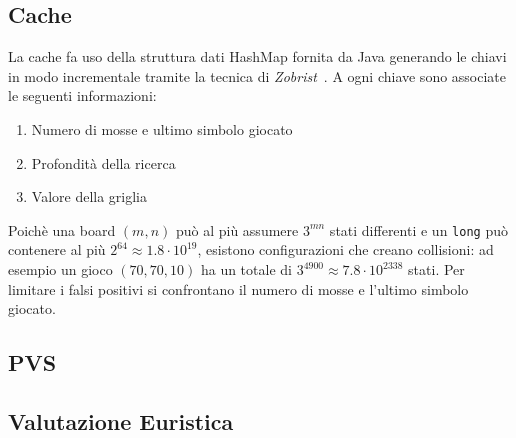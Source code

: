 \documentclass{article}
\begin{document}
\subsection{Cache}
La cache fa uso della struttura dati HashMap fornita da Java generando le chiavi 
in modo incrementale tramite la tecnica di \emph{Zobrist}~\cite{zobrist}. A ogni
chiave sono associate le seguenti informazioni:
\begin{enumerate}
  \item Numero di mosse e ultimo simbolo giocato
  \item Profondit\`a della ricerca
  \item Valore della griglia
\end{enumerate}
Poich\`e una board $(m,n)$ pu\`o al pi\`u assumere $3^{mn}$ stati differenti e
un \verb!long! pu\`o contenere al pi\`u $2^{64} \approx 1.8 \cdot 10^{19}$,
esistono configurazioni che creano collisioni: ad esempio un gioco $(70, 70, 10)$
ha un totale di $3^{4900} \approx 7.8 \cdot 10^{2338}$ stati. Per limitare i
falsi positivi si confrontano il numero di mosse e l'ultimo simbolo giocato.


\subsection{PVS}
\subsection{Valutazione Euristica}

\pagebreak


\end{document}
